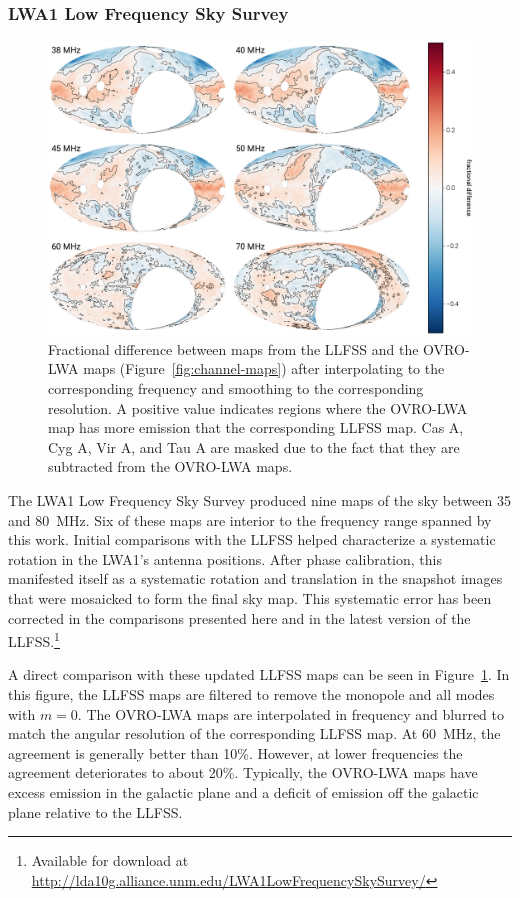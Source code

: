\begin{bibunit}
\subsubsection{LWA1 Low Frequency Sky Survey}

\begin{figure}[t]
    \centering
    \includegraphics[width=\textwidth]{figures/chapter3/lwa1}
    \caption{
        Fractional difference between maps from the LLFSS and the OVRO-LWA maps
        (Figure~\ref{fig:channel-maps}) after interpolating to the corresponding frequency and
        smoothing to the corresponding resolution. A positive value indicates regions where the
        OVRO-LWA map has more emission that the corresponding LLFSS map. Cas A, Cyg A, Vir A, and
        Tau A are masked due to the fact that they are subtracted from the OVRO-LWA maps.
    }
    \label{fig:lwa1-comparison}
\end{figure}

The LWA1 Low Frequency Sky Survey \citep[LLFSS;][]{2017MNRAS.469.4537D} produced nine maps of the
sky between 35 and 80~MHz. Six of these maps are interior to the frequency range spanned by this
work. Initial comparisons with the LLFSS helped characterize a systematic rotation in the LWA1's
antenna positions. After phase calibration, this manifested itself as a systematic rotation and
translation in the snapshot images that were mosaicked to form the final sky map. This systematic
error has been corrected in the comparisons presented here and in the latest version of the
LLFSS.\footnote{
    Available for download at \url{http://lda10g.alliance.unm.edu/LWA1LowFrequencySkySurvey/}
}

A direct comparison with these updated LLFSS maps can be seen in Figure~\ref{fig:lwa1-comparison}.
In this figure, the LLFSS maps are filtered to remove the monopole and all modes with $m=0$. The
OVRO-LWA maps are interpolated in frequency and blurred to match the angular resolution of the
corresponding LLFSS map.  At 60~MHz, the agreement is generally better than 10\%. However, at lower
frequencies the agreement deteriorates to about 20\%.  Typically, the OVRO-LWA maps have excess
emission in the galactic plane and a deficit of emission off the galactic plane relative to the
LLFSS.


\end{bibunit}
